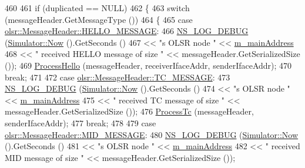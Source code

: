 \begin{DoxyCode}
460 
461       \textcolor{keywordflow}{if} (duplicated == NULL)
462         \{
463           \textcolor{keywordflow}{switch} (messageHeader.GetMessageType ())
464             \{
465             \textcolor{keywordflow}{case} \hyperlink{classns3_1_1olsr_1_1MessageHeader_aff5a31b07c415097a5ada41d53e9a99ea95ef9dc453d91d351d1a35cc4650e192}{olsr::MessageHeader::HELLO\_MESSAGE}:
466               \hyperlink{group__logging_ga413f1886406d49f59a6a0a89b77b4d0a}{NS\_LOG\_DEBUG} (\hyperlink{classns3_1_1Simulator_ac3178fa975b419f7875e7105be122800}{Simulator::Now} ().GetSeconds ()
467                             << \textcolor{stringliteral}{"s OLSR node "} << \hyperlink{classns3_1_1olsr_1_1RoutingProtocol_a58cc50ed5d1039aab603e90e318aabfb}{m\_mainAddress}
468                             << \textcolor{stringliteral}{" received HELLO message of size "} << messageHeader.GetSerializedSize ());
469               \hyperlink{classns3_1_1olsr_1_1RoutingProtocol_a9518c29e8994234ead40d408498237ce}{ProcessHello} (messageHeader, receiverIfaceAddr, senderIfaceAddr);
470               \textcolor{keywordflow}{break};
471 
472             \textcolor{keywordflow}{case} \hyperlink{classns3_1_1olsr_1_1MessageHeader_aff5a31b07c415097a5ada41d53e9a99ea079e75713d9846b17df8b9d722ee5ab3}{olsr::MessageHeader::TC\_MESSAGE}:
473               \hyperlink{group__logging_ga413f1886406d49f59a6a0a89b77b4d0a}{NS\_LOG\_DEBUG} (\hyperlink{classns3_1_1Simulator_ac3178fa975b419f7875e7105be122800}{Simulator::Now} ().GetSeconds ()
474                             << \textcolor{stringliteral}{"s OLSR node "} << \hyperlink{classns3_1_1olsr_1_1RoutingProtocol_a58cc50ed5d1039aab603e90e318aabfb}{m\_mainAddress}
475                             << \textcolor{stringliteral}{" received TC message of size "} << messageHeader.GetSerializedSize ());
476               \hyperlink{classns3_1_1olsr_1_1RoutingProtocol_a5087b5cbf87313f1073341aebc9ced27}{ProcessTc} (messageHeader, senderIfaceAddr);
477               \textcolor{keywordflow}{break};
478 
479             \textcolor{keywordflow}{case} \hyperlink{classns3_1_1olsr_1_1MessageHeader_aff5a31b07c415097a5ada41d53e9a99ea56ed595e1305b9889be591227fb9997b}{olsr::MessageHeader::MID\_MESSAGE}:
480               \hyperlink{group__logging_ga413f1886406d49f59a6a0a89b77b4d0a}{NS\_LOG\_DEBUG} (\hyperlink{classns3_1_1Simulator_ac3178fa975b419f7875e7105be122800}{Simulator::Now} ().GetSeconds ()
481                             << \textcolor{stringliteral}{"s OLSR node "} << \hyperlink{classns3_1_1olsr_1_1RoutingProtocol_a58cc50ed5d1039aab603e90e318aabfb}{m\_mainAddress}
482                             <<  \textcolor{stringliteral}{" received MID message of size "} << messageHeader.GetSerializedSize ());

\end{DoxyCode}
